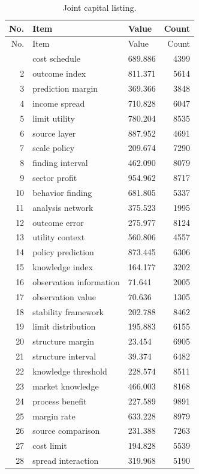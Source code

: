 \documentclass[11pt]{report}
\begin{document}
\begin{longtable}{rllr}\caption{Joint capital listing.}\label{tab:l5}\\\toprule No. & Item & Value & Count \\ \midrule \endfirsthead\toprule No. & Item & Value & Count \\ \midrule \endhead\bottomrule \endfoot
1 & cost schedule & 689.886 & 4399 \\
2 & outcome index & 811.371 & 5614 \\
3 & prediction margin & 369.366 & 3848 \\
4 & income spread & 710.828 & 6047 \\
5 & limit utility & 780.204 & 8535 \\
6 & source layer & 887.952 & 4691 \\
7 & scale policy & 209.674 & 7290 \\
8 & finding interval & 462.090 & 8079 \\
9 & sector profit & 954.962 & 8717 \\
10 & behavior finding & 681.805 & 5337 \\
11 & analysis network & 375.523 & 1995 \\
12 & outcome error & 275.977 & 8124 \\
13 & utility context & 560.806 & 4557 \\
14 & policy prediction & 873.445 & 6306 \\
15 & knowledge index & 164.177 & 3202 \\
16 & observation information & 71.641 & 2005 \\
17 & observation value & 70.636 & 1305 \\
18 & stability framework & 202.788 & 8462 \\
19 & limit distribution & 195.883 & 6155 \\
20 & structure margin & 23.454 & 6905 \\
21 & structure interval & 39.374 & 6482 \\
22 & knowledge threshold & 228.574 & 8511 \\
23 & market knowledge & 466.003 & 8168 \\
24 & process benefit & 227.589 & 9891 \\
25 & margin rate & 633.228 & 8979 \\
26 & source comparison & 231.388 & 7263 \\
27 & cost limit & 194.828 & 5539 \\
28 & spread interaction & 319.968 & 5190 \\

\end{longtable}
\end{document}
